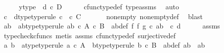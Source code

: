 \begin{isabellebody}
\ \ \isamarkupfalse%
\ \isamarkupfalse%
\ y{\isacharunderscore}{\kern0pt}type{}{\isacharcolon}{\kern0pt}\ \ {\isachardoublequoteopen}d\ {\isasymin}\isactrlsub c\ D{\isachardoublequoteclose}\isanewline
\ \ \ \ \isamarkupfalse%
\ cfunc{\isacharunderscore}{\kern0pt}type{\isacharunderscore}{\kern0pt}def\ type{\isacharunderscore}{\kern0pt}assms{\isacharparenleft}{\kern0pt}{}{\isacharparenright}{\kern0pt}\ \isamarkupfalse%
\ auto\isanewline
\ \ \isamarkupfalse%
\ c\ \ d{\isacharunderscore}{\kern0pt}type{\isacharbrackleft}{\kern0pt}type{\isacharunderscore}{\kern0pt}rule{\isacharbrackright}{\kern0pt}{\isacharcolon}{\kern0pt}\ {\isachardoublequoteopen}c\ \ {\isasymin}\isactrlsub c\ C{\isachardoublequoteclose}\ \isanewline
\ \ \ \ \isamarkupfalse%
\ nonempty\ nonempty{\isacharunderscore}{\kern0pt}def\ \isamarkupfalse%
\ blast\isanewline
\ \ \isamarkupfalse%
\ \isamarkupfalse%
\ ab\ \ ab{\isacharunderscore}{\kern0pt}type{\isacharbrackleft}{\kern0pt}type{\isacharunderscore}{\kern0pt}rule{\isacharbrackright}{\kern0pt}{\isacharcolon}{\kern0pt}\ {\isachardoublequoteopen}ab\ {\isasymin}\isactrlsub c\ A\ {\isasymtimes}\isactrlsub c\ B{\isachardoublequoteclose}\ \ ab{\isacharunderscore}{\kern0pt}def{\isacharcolon}{\kern0pt}\ {\isachardoublequoteopen}{\isacharparenleft}{\kern0pt}f\ {\isasymtimes}\isactrlsub f\ g{\isacharparenright}{\kern0pt}\ {\isasymcirc}\isactrlsub c\ ab\ {\isacharequal}{\kern0pt}\ {\isasymlangle}c{\isacharcomma}{\kern0pt}\ d{\isasymrangle}{\isachardoublequoteclose}\isanewline
\ \ \ \ \isamarkupfalse%
\ assms\ \isamarkupfalse%
\ {\isacharparenleft}{\kern0pt}typecheck{\isacharunderscore}{\kern0pt}cfuncs{\isacharcomma}{\kern0pt}\ metis\ assms{\isacharparenleft}{\kern0pt}{}{\isacharparenright}{\kern0pt}\ cfunc{\isacharunderscore}{\kern0pt}type{\isacharunderscore}{\kern0pt}def\ surjective{\isacharunderscore}{\kern0pt}def{}{\isacharparenright}{\kern0pt}\isanewline
\ \ \isamarkupfalse%
\ \isamarkupfalse%
\ a\ b\ \ a{\isacharunderscore}{\kern0pt}type{\isacharbrackleft}{\kern0pt}type{\isacharunderscore}{\kern0pt}rule{\isacharbrackright}{\kern0pt}{\isacharcolon}{\kern0pt}\ {\isachardoublequoteopen}a\ {\isasymin}\isactrlsub c\ A{\isachardoublequoteclose}\ \ b{\isacharunderscore}{\kern0pt}type{\isacharbrackleft}{\kern0pt}type{\isacharunderscore}{\kern0pt}rule{\isacharbrackright}{\kern0pt}{\isacharcolon}{\kern0pt}\ {\isachardoublequoteopen}b\ {\isasymin}\isactrlsub c\ B{\isachardoublequoteclose}\ \ ab{\isacharunderscore}{\kern0pt}def{}{\isacharcolon}{\kern0pt}\ {\isachardoublequoteopen}ab\ {\isacharequal}{\kern0pt}\ {\isasymlangle}a{\isacharcomma}{\kern0pt}b{\isasymrangle}{\isachardoublequoteclose}\isanewline

\end{isabellebody}
